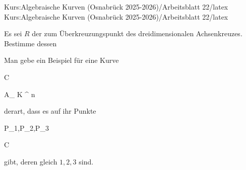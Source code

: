 Kurs:Algebraische Kurven (Osnabrück 2025-2026)/Arbeitsblatt 22/latex
Kurs:Algebraische Kurven (Osnabrück 2025-2026)/Arbeitsblatt 22/latex

\setcounter{section}{22}





{}

{


Es sei $R$ der
zum Überkreuzungspunkt des dreidimensionalen Achsenkreuzes. Bestimme dessen


}

{} {}



{}

{


Man gebe ein Beispiel für eine Kurve


\mavergleichskette

{\vergleichskette

{C
}

{ \subseteq }{ { {\mathbb A}_{  K }^{  n   } }
}

{  }{
}

{    }{
}

{   }{
}

}
{}{}{}
derart, dass es auf ihr Punkte


\mavergleichskette

{\vergleichskette

{ P_1,P_2,P_3
}

{ \in }{ C
}

{  }{
}

{    }{
}

{   }{
}

}
{}{}{}
gibt, deren
gleich $1,2,3$ sind.


}

{} {}



{}

